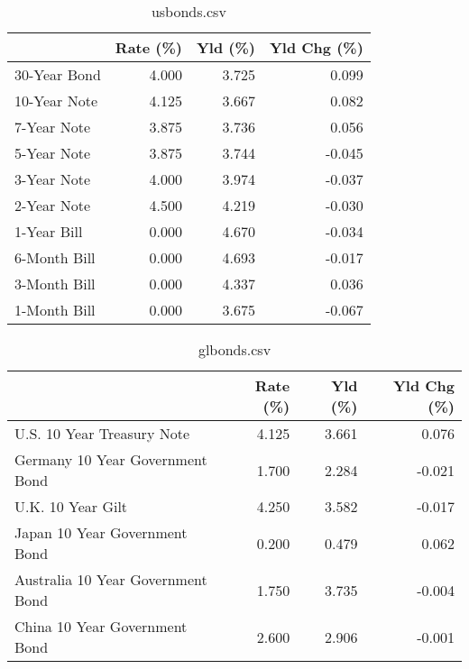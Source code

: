 \documentclass{article}%
\begin{document}
%


\begin{table}[htbp]%
\caption{usbonds.csv}%
\centering%
\begin{adjustbox}{width=1\textwidth}%
\begin{tabular}{lrrr}
\toprule
             &  Rate (\%) &  Yld (\%) &  Yld Chg (\%) \\
\midrule
30-Year Bond &     4.000 &    3.725 &        0.099 \\
10-Year Note &     4.125 &    3.667 &        0.082 \\
 7-Year Note &     3.875 &    3.736 &        0.056 \\
 5-Year Note &     3.875 &    3.744 &       -0.045 \\
 3-Year Note &     4.000 &    3.974 &       -0.037 \\
 2-Year Note &     4.500 &    4.219 &       -0.030 \\
 1-Year Bill &     0.000 &    4.670 &       -0.034 \\
6-Month Bill &     0.000 &    4.693 &       -0.017 \\
3-Month Bill &     0.000 &    4.337 &        0.036 \\
1-Month Bill &     0.000 &    3.675 &       -0.067 \\
\bottomrule
\end{tabular}
%
\end{adjustbox}%
\end{table}

%


\begin{table}[htbp]%
\caption{glbonds.csv}%
\centering%
\begin{adjustbox}{width=1\textwidth}%
\begin{tabular}{lrrr}
\toprule
                                  &  Rate (\%) &  Yld (\%) &  Yld Chg (\%) \\
\midrule
       U.S. 10 Year Treasury Note &     4.125 &    3.661 &        0.076 \\
  Germany 10 Year Government Bond &     1.700 &    2.284 &       -0.021 \\
                U.K. 10 Year Gilt &     4.250 &    3.582 &       -0.017 \\
    Japan 10 Year Government Bond &     0.200 &    0.479 &        0.062 \\
Australia 10 Year Government Bond &     1.750 &    3.735 &       -0.004 \\
    China 10 Year Government Bond &     2.600 &    2.906 &       -0.001 \\
\bottomrule
\end{tabular}
%
\end{adjustbox}%
\end{table}
\end{document}
